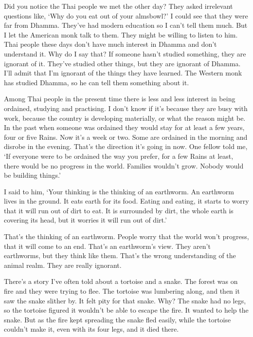 Did you notice the Thai people we met the other day? They asked irrelevant questions like, `Why do you eat out of your almsbowl?' I could see that they were far from Dhamma. They've had modern education so I can't tell them much. But I let the American monk talk to them. They might be willing to listen to him. Thai people these days don't have much interest in Dhamma and don't understand it. Why do I say that? If someone hasn't studied something, they are ignorant of it. They've studied other things, but they are ignorant of Dhamma. I'll admit that I'm ignorant of the things they have learned. The Western monk has studied Dhamma, so he can tell them something about it. 

Among Thai people in the present time there is less and less interest in being ordained, studying and practising. I don't know if it's because they are busy with work, because the country is developing materially, or what the reason might be. In the past when someone was ordained they would stay for at least a few years, four or five Rains. Now it's a week or two. Some are ordained in the morning and disrobe in the evening. That's the direction it's going in now. One fellow told me, `If everyone were to be ordained the way you prefer, for a few Rains at least, there would be no progress in the world. Families wouldn't grow. Nobody would be building things.' 

I said to him, `Your thinking is the thinking of an earthworm. An earthworm lives in the ground. It eats earth for its food. Eating and eating, it starts to worry that it will run out of dirt to eat. It is surrounded by dirt, the whole earth is covering its head, but it worries it will run out of dirt.' 

That's the thinking of an earthworm. People worry that the world won't progress, that it will come to an end. That's an earthworm's view. They aren't earthworms, but they think like them. That's the wrong understanding of the animal realm. They are really ignorant. 

There's a story I've often told about a tortoise and a snake. The forest was on fire and they were trying to flee. The tortoise was lumbering along, and then it saw the snake slither by. It felt pity for that snake. Why? The snake had no legs, so the tortoise figured it wouldn't be able to escape the fire. It wanted to help the snake. But as the fire kept spreading the snake fled easily, while the tortoise couldn't make it, even with its four legs, and it died there. 

